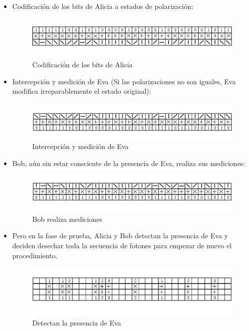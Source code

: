 \documentclass[11pt, conference]{IEEEtran}
\begin{document}
\begin{itemize}
	\item Codificación de los bits de Alicia a estados de polarización:
	
	\begin{figure}[hbtp]
		\centering
		\includegraphics[scale=0.22]{7.png} 
		\caption{Codificación de los bits de Alicia}
	\end{figure}
	\item Intercepción y medición de Eva (Si las polarizaciones no son iguales, Eva modifica irreparablemente el estado original):
	
	\begin{figure}[hbtp]
		\centering
		\includegraphics[scale=0.22]{8.png} 
		\caption{Intercepción y medición de Eva}
	\end{figure}
	\pagebreak
	\item Bob, aún sin estar consciente de la presencia de Eva, realiza sus mediciones:
	
	\begin{figure}[hbtp]
		\centering
		\includegraphics[scale=0.22]{9.png} 
		\caption{Bob realiza mediciones}
	\end{figure}
	
	\item Pero en la fase de prueba, Alicia y Bob detectan la presencia de Eva y deciden desechar toda la secuencia de fotones para empezar de nuevo el procedimiento.
	
	\begin{figure}[hbtp]
		\centering
		\includegraphics[scale=0.22]{10.png} 
		\caption{Detectan la presencia de Eva}
	\end{figure}
\end{itemize}
\end{document}
